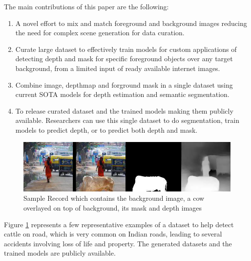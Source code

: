 \documentclass[review]{cvpr}
\begin{document}
The main contributions of this paper are the following:
\begin{enumerate}
\item A novel effort to mix and match foreground and background images reducing the need for complex scene generation for data curation.
\item Curate large dataset to effectively train models for custom applications of detecting depth and mask for specific foreground objects over any target background, from a limited input of ready available internet images.
\item Combine image, depthmap and forground mask in a single dataset using current SOTA models for depth estimation and semantic segmentation.
\item To release curated dataset and the trained models making them publicly available. Researchers can use this single dataset to do segmentation, 
train models to predict depth, or to predict both depth and mask.
\end{enumerate}
  

\begin{figure}
  \begin{center}
    \includegraphics[width=1\textwidth]{samplerecord.png}
  \end{center}
  \caption{Sample Record which contains the background image, a cow overlayed on top of background, its mask and depth images}
  \label{fig:sampledatarecord}
\end{figure}

Figure \ref{fig:sampledatarecord} represents a few representative examples of a dataset to help detect cattle on road,
 which is very common on Indian roads, leading to several accidents involving loss of life and property. 
 The generated datasets and the trained models are publicly available.





\end{document}

